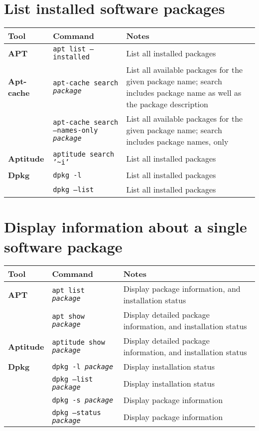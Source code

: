 \documentclass[10pt]{article}
\begin{document}
\section{List installed software packages}
\begin{tabular}{ p{3.5cm} p{9cm} p{11cm}}
  \hline
  \rowcolor{Gray}
  \textbf{Tool} & \textbf{Command} & \textbf{Notes} \\
  \hline 
  \textbf{APT}& \texttt{apt list --installed} & List all installed packages\\
  \rowcolor{Gray}
  \textbf{Apt-cache} & \texttt{apt-cache search \textit{package}} & List all available packages for the given package name; search includes package name as well as the package description \\
  & \texttt{apt-cache search --names-only \textit{package}} & List all available packages for the given package name; search includes package names, only \\
  \rowcolor{Gray}
  \textbf{Aptitude} & \texttt{aptitude search '\textasciitilde{}i'} & List all installed packages \\
  \textbf{Dpkg} & \texttt{dpkg -l} & List all installed packages \\
  \rowcolor{Gray}
  & \texttt{dpkg --list} & List all installed packages \\
  \hline
\end{tabular}

\section{Display information about a single software package}
\begin{tabular}{ p{3.5cm} p{9cm} p{11cm}}
  \hline
  \rowcolor{Gray}
  \textbf{Tool} & \textbf{Command} & \textbf{Notes} \\
  \hline 
  \textbf{APT} & \texttt{apt list \textit{package}} & Display package information, and installation status \\
  \rowcolor{Gray}
  & \texttt{apt show \textit{package}} & Display detailed package information, and installation status \\
  \textbf{Aptitude} & \texttt{aptitude show \textit{package}} &  Display detailed package information, and installation status \\
  \textbf{Dpkg} & \texttt{dpkg -l \textit{package} } & Display installation status \\
  \rowcolor{Gray}
  & \texttt{dpkg --list \textit{package} } & Display installation status \\
  & \texttt{dpkg -s \textit{package} } & Display package information\\
  \rowcolor{Gray}
  & \texttt{dpkg --status \textit{package} } & Display package information \\
  \hline
\end{tabular}
\end{document}
